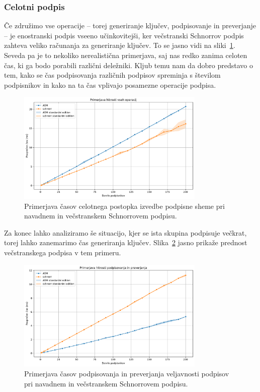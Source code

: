 \documentclass[isrm2, tisk]{fmfdelo}
\begin{document}
\subsubsection{Celotni podpis}
Če združimo vse operacije -- torej generiranje ključev, podpisovanje in preverjanje -- je enostranski
podpis vseeno učinkovitejši, ker večstranski Schnorrov podpis zahteva veliko računanja za generiranje
ključev. To se jasno vidi na sliki~\ref{fig:celotni}. Seveda pa je to nekoliko nerealistična primerjava,
saj nas redko zanima celoten čas, ki ga bodo porabili različni deležniki. Kljub temu nam da dobro
predstavo o tem, kako se čas podpisovanja različnih podpisov spreminja s številom podpisnikov in kako
na ta čas vplivajo posamezne operacije podpisa.

\begin{figure}[ht]
  \centering
  \includegraphics[width=0.8\textwidth]{images/benchmark_All.pdf}
  \caption[Celotni podpis.]{Primerjava časov celotnega postopka izvedbe podpisne sheme pri navadnem
      in večstranskem Schnorrovem podpisu.}
  \label{fig:celotni}
\end{figure}

Za konec lahko analiziramo še situacijo, kjer se ista skupina podpisuje večkrat, torej lahko zanemarimo
čas generiranja ključev. Slika~\ref{fig:podpis-preverjanje} jasno prikaže prednost večstranskega
podpisa v tem primeru.

\begin{figure}[ht]
  \centering
  \includegraphics[width=0.8\textwidth]{images/benchmark_SigningVerification.pdf}
  \caption[Podpisovanje in preverjanje.]{Primerjava časov podpisovanja in preverjanja veljavnosti
    podpisov pri navadnem in večstranskem Schnorrovem podpisu.}
  \label{fig:podpis-preverjanje}
\end{figure}
\end{document}
